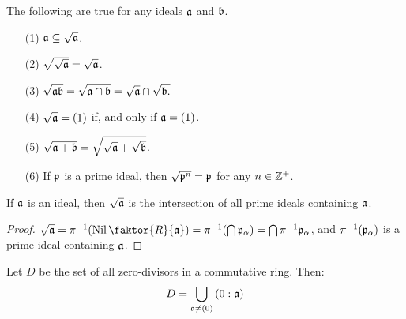 \begin{lemma}\label{lemma_5.5.14}
  The following are true for any ideals $\af$ and  $\bf$.
  \begin{enumerate}
    \item[(1)] $\af \subseteq \sqrt{\af}$.

    \item[(2)] $\sqrt{\sqrt{\af}}=\sqrt{\af}$.

    \item[(3)] $\sqrt{\af\bf}=\sqrt{\af \cap \bf}=\sqrt{\af} \cap \sqrt{\bf.}$

    \item[(4)] $\sqrt{\af}=(1)$ if, and only if $\af=(1)$.

    \item[(5)] $\sqrt{\af+\bf}=\sqrt{\sqrt{\af}+\sqrt{\bf}}$.

    \item[(6)] If $\pf$ is a prime ideal, then $\sqrt{\pf^n}=\pf$ for any $n \in
      \Z^+$.
  \end{enumerate}
\end{lemma}

\begin{lemma}\label{lemma_5.5.15}
  If $\af$ is an ideal, then $\sqrt{\af}$ is the intersection of all prime
  ideals containing $\af$.
\end{lemma}
\begin{proof}
  $\sqrt{\af}=\inv{\pi}(\Nil{\faktor{R}{\af}})=\inv{\pi}(\bigcap{\pf_\a})=
  \bigcap{\inv{\pi}\pf_\a}$, and  $\inv{\pi}(\pf_\a)$ is a prime ideal
  containing $\af$.
\end{proof}

\begin{lemma}\label{lemma_5.5.16}
  Let $D$ be the set of all zero-divisors in a commutative ring. Then:
  \begin{equation}
    D=\bigcup_{\af \neq (0)}{(0:\af)}
  \end{equation}
\end{lemma}
